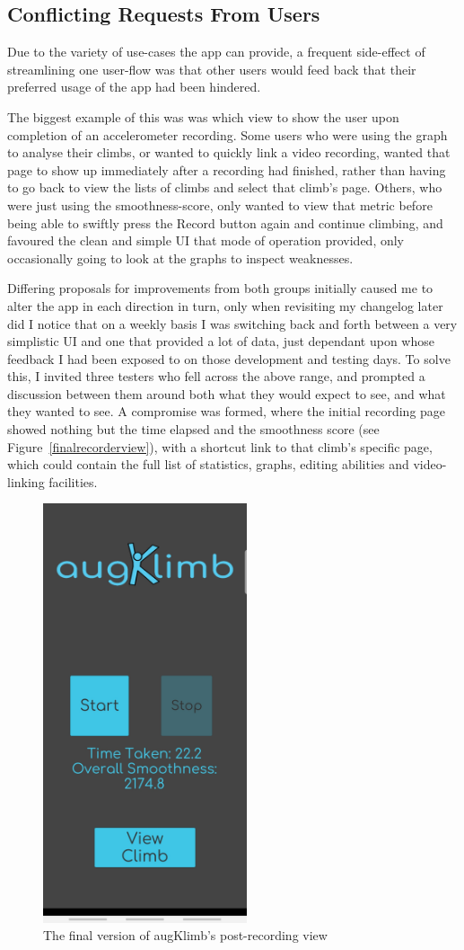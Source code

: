 \subsection{Conflicting Requests From Users}
\label{conflict}
Due to the variety of use-cases the app can provide, a frequent side-effect of streamlining one user-flow was that other users would feed back that their preferred usage of the app had been hindered.

The biggest example of this was was which view to show the user upon completion of an accelerometer recording.
Some users who were using the graph to analyse their climbs, or wanted to quickly link a video recording, wanted that page to show up immediately after a recording had finished, rather than having to go back to view the lists of climbs and select that climb's page.
Others, who were just using the smoothness-score, only wanted to view that metric before being able to swiftly press the Record button again and continue climbing, and favoured the clean and simple UI that mode of operation provided, only occasionally going to look at the graphs to inspect weaknesses.

Differing proposals for improvements from both groups initially caused me to alter the app in each direction in turn, only when revisiting my changelog later did I notice that on a weekly basis I was switching back and forth between a very simplistic  UI and one that provided a lot of data, just dependant upon whose feedback I had been exposed to on those development and testing days.
To solve this, I invited three testers who fell across the above range, and prompted a discussion between them around both what they would expect to see, and what they wanted to see.
A compromise was formed, where the initial recording page showed nothing but the time elapsed and the smoothness score (see Figure~\ref{finalrecorderview}), with a shortcut link to that climb's specific page, which could contain the full list of statistics, graphs, editing abilities and video-linking facilities.



\begin{figure}[h]
\centering
\includegraphics[width=6cm]{imgs/finalrecorderview}
\caption{The final version of augKlimb's post-recording view}
\label{fig:finalrecorderview}
\end{figure}


